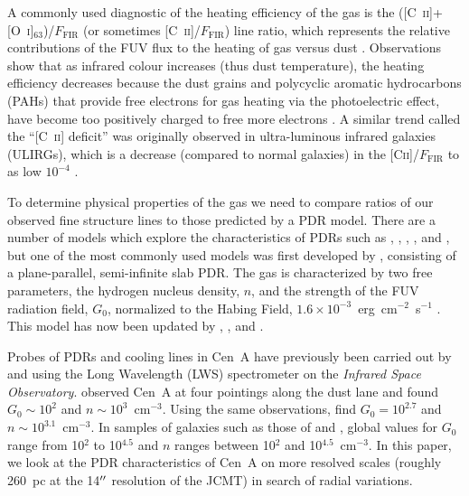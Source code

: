 A commonly used diagnostic of the heating efficiency of the gas is the
([C~\textsc{ii}]+[O~\textsc{i}]$_{63}$)/$F_{\mathrm{FIR}}$ (or sometimes [C~\textsc{ii}]/$F_{\mathrm{FIR}}$) line ratio, which represents the relative contributions of the FUV flux to the heating of gas versus dust \citep{1985ApJ...291..722T}.  Observations show that as infrared colour increases (thus dust temperature), the heating efficiency decreases because the dust grains and polycyclic aromatic hydrocarbons (PAHs) that provide free electrons for gas heating via the photoelectric effect, have become too positively charged to free more electrons \citep{2001ApJ...561..766M, 2008ApJS..178..280B, 2011ApJ...728L...7G, 2012ApJ...747...81C, 2012A&A...544A..55B, 2012A&A...548A..91L, 2013A&A...549A.118C, parkin_2013}.  A similar trend called the ``[C~\textsc{ii}] deficit'' was originally observed in ultra-luminous infrared galaxies (ULIRGs), which is a decrease (compared to normal galaxies) in the [C\textsc{ii}]/$F_{\mathrm{FIR}}$ to as low $10^{-4}$ \citep[e.g.][]{1998ApJ...504L..11L,2003ApJ...594..758L}.

To determine physical properties of the gas we need to compare ratios of our observed fine structure lines to those predicted by a PDR model.  There are a number of models which explore the characteristics of PDRs such as \citet{1986ApJS...62..109V,1988ApJ...334..771V}, \citet{1989ApJ...338..197S, 1995ApJS...99..565S}, \citet{1997ApJ...482..298L}, \citet{2000A&A...358..682S}, \citet{2006ApJS..164..506L} and \citet{2006A&A...451..917R}, but one of the most commonly used models was first developed by \citet{1985ApJ...291..722T}, consisting of a plane-parallel, semi-infinite slab PDR.  The gas is characterized by two free parameters, the hydrogen nucleus density, $n$, and the strength of the FUV radiation field, $G_0$, normalized to the Habing Field, $1.6 \times 10^{-3}$~erg~cm$^{-2}$~s$^{-1}$ \citep{1968BAN....19..421H}.  This model has now been updated by \citet{1990ApJ...358..116W}, \cite{1991ApJ...377..192H}, and \citet{1999ApJ...527..795K,2006ApJ...644..283K}.

Probes of PDRs and cooling lines in Cen~A have previously been carried out by \citet{2000A&A...355..885U} and \citet{2001A&A...375..566N} using the Long Wavelength (LWS) spectrometer on the \emph{Infrared Space Observatory}.  \citet{2000A&A...355..885U} observed Cen~A at four pointings along the dust lane and found $G_{0} \sim 10^{2}$ and $n \sim 10^{3}$~cm$^{-3}$.  Using the same observations, \citet{2001A&A...375..566N} find $G_{0} = 10^{2.7}$ and $n \sim 10^{3.1}$~cm$^{-3}$.  In samples of galaxies such as those of \citet{2001ApJ...561..766M} and \citet{2001A&A...375..566N}, global values for $G_{0}$ range from 10$^{2}$ to 10$^{4.5}$ and $n$ ranges between 10$^{2}$ and 10$^{4.5}$~cm$^{-3}$.  In this paper, we look at the PDR characteristics of Cen~A on more resolved scales (roughly 260~pc at the 14$\mbox{$^{\prime\prime}$}$ resolution of the JCMT) in search of radial variations.

